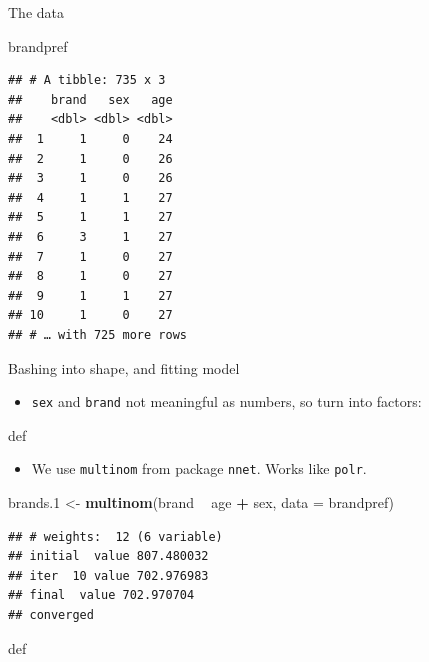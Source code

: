 \documentclass[ignorenonframetext,]{beamer}
\newenvironment{Shaded}{\begin{snugshade}}{\end{snugshade}}
\newcommand{\DataTypeTok}[1]{\textcolor[rgb]{0.13,0.29,0.53}{#1}}
\newcommand{\FloatTok}[1]{\textcolor[rgb]{0.00,0.00,0.81}{#1}}
\newcommand{\KeywordTok}[1]{\textcolor[rgb]{0.13,0.29,0.53}{\textbf{#1}}}
\newcommand{\NormalTok}[1]{#1}
\newcommand{\OperatorTok}[1]{\textcolor[rgb]{0.81,0.36,0.00}{\textbf{#1}}}
\newcommand{\StringTok}[1]{\textcolor[rgb]{0.31,0.60,0.02}{#1}}
\providecommand{\tightlist}{%
  \setlength{\itemsep}{0pt}\setlength{\parskip}{0pt}}
\begin{document}
\begin{frame}[fragile]{The data}
\protect\hypertarget{the-data-4}{}

\begin{Shaded}
\begin{Highlighting}[]
\NormalTok{brandpref}
\end{Highlighting}
\end{Shaded}

\begin{verbatim}
## # A tibble: 735 x 3
##    brand   sex   age
##    <dbl> <dbl> <dbl>
##  1     1     0    24
##  2     1     0    26
##  3     1     0    26
##  4     1     1    27
##  5     1     1    27
##  6     3     1    27
##  7     1     0    27
##  8     1     0    27
##  9     1     1    27
## 10     1     0    27
## # … with 725 more rows
\end{verbatim}

\end{frame}

\begin{frame}[fragile]{Bashing into shape, and fitting model}
\protect\hypertarget{bashing-into-shape-and-fitting-model}{}

\begin{itemize}
\tightlist
\item
  \texttt{sex} and \texttt{brand} not meaningful as numbers, so turn
  into factors:
\end{itemize}

\begin{Shaded}
\end{Shaded}

def

\begin{itemize}
\tightlist
\item
  We use \texttt{multinom} from package \texttt{nnet}. Works like
  \texttt{polr}.
\end{itemize}

\begin{Shaded}
\begin{Highlighting}[]
\NormalTok{brands}\FloatTok{.1}\NormalTok{ <-}\StringTok{ }\KeywordTok{multinom}\NormalTok{(brand }\OperatorTok{~}\StringTok{ }\NormalTok{age }\OperatorTok{+}\StringTok{ }\NormalTok{sex, }\DataTypeTok{data =}\NormalTok{ brandpref)}
\end{Highlighting}
\end{Shaded}

\begin{verbatim}
## # weights:  12 (6 variable)
## initial  value 807.480032 
## iter  10 value 702.976983
## final  value 702.970704 
## converged
\end{verbatim}

def

\end{frame}
\end{document}
